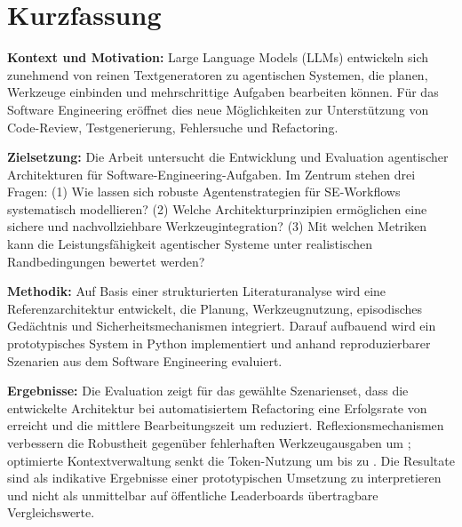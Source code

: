 

\chapter*{Kurzfassung}

\begingroup
\setlength{\parskip}{0.5em}
\textbf{Kontext und Motivation:} Large Language Models (LLMs) entwickeln sich zunehmend von reinen Textgeneratoren zu agentischen Systemen, die planen, Werkzeuge einbinden und mehrschrittige Aufgaben bearbeiten können. Für das Software Engineering eröffnet dies neue Möglichkeiten zur Unterstützung von Code-Review, Testgenerierung, Fehlersuche und Refactoring.

\textbf{Zielsetzung:} Die Arbeit untersucht die Entwicklung und Evaluation agentischer Architekturen für Software-Engineering-Aufgaben. Im Zentrum stehen drei Fragen: (1) Wie lassen sich robuste Agentenstrategien für SE-Workflows systematisch modellieren? (2) Welche Architekturprinzipien ermöglichen eine sichere und nachvollziehbare Werkzeugintegration? (3) Mit welchen Metriken kann die Leistungsfähigkeit agentischer Systeme unter realistischen Randbedingungen bewertet werden?

\textbf{Methodik:} Auf Basis einer strukturierten Literaturanalyse wird eine Referenzarchitektur entwickelt, die Planung, Werkzeugnutzung, episodisches Gedächtnis und Sicherheitsmechanismen integriert. Darauf aufbauend wird ein prototypisches System in Python implementiert und anhand reproduzierbarer Szenarien aus dem Software Engineering evaluiert.

\textbf{Ergebnisse:} Die Evaluation zeigt für das gewählte Szenarienset, dass die entwickelte Architektur bei automatisiertem Refactoring eine Erfolgsrate von  erreicht und die mittlere Bearbeitungszeit um  reduziert. Reflexionsmechanismen verbessern die Robustheit gegenüber fehlerhaften Werkzeugausgaben um ; optimierte Kontextverwaltung senkt die Token-Nutzung um bis zu . Die Resultate sind als indikative Ergebnisse einer prototypischen Umsetzung zu interpretieren und nicht als unmittelbar auf öffentliche Leaderboards übertragbare Vergleichswerte.

